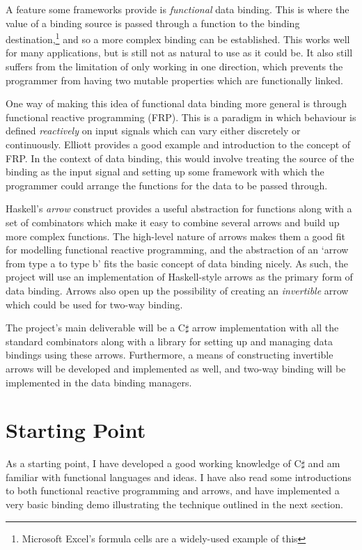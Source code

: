 	A feature some frameworks provide is \textit{functional} data binding. This is where the value of a binding source is passed through a function to the binding destination,\footnote{Microsoft Excel's formula cells are a widely-used example of this} and so a more complex binding can be established. This works well for many applications, but is still not as natural to use as it could be. It also still suffers from the limitation of only working in one direction, which prevents the programmer from having two mutable properties which are functionally linked.
	
	One way of making this idea of functional data binding more general is through functional reactive programming (FRP). This is a paradigm in which behaviour is defined \textit{reactively} on input signals which can vary either discretely or continuously. Elliott\cite{elliott98} provides a good example and introduction to the concept of FRP. In the context of data binding, this would involve treating the source of the binding as the input signal and setting up some framework with which the programmer could arrange the functions for the data to be passed through.
	
	Haskell's \textit{arrow} construct\cite{haskellarrows} provides a useful abstraction for functions along with a set of combinators which make it easy to combine several arrows and build up more complex functions.\cite{paterson03} The high-level nature of arrows makes them a good fit for modelling functional reactive programming, and the abstraction of an `arrow from type a to type b' fits the basic concept of data binding nicely. As such, the project will use an implementation of Haskell-style arrows as the primary form of data binding. Arrows also open up the possibility of creating an \textit{invertible} arrow which could be used for two-way binding.
	
	The project's main deliverable will be a C$\sharp$ arrow implementation with all the standard combinators along with a library for setting up and managing data bindings using these arrows. Furthermore, a means of constructing invertible arrows will be developed and implemented as well, and two-way binding will be implemented in the data binding managers.

\section*{Starting Point}

	As a starting point, I have developed a good working knowledge of C$\sharp$ and am familiar with functional languages and ideas. I have also read some introductions to both functional reactive programming and arrows, and have implemented a very basic binding demo illustrating the technique outlined in the next section.

